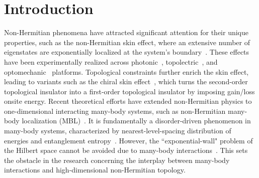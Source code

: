 \documentclass[longbibliography, aps, prx, amsmath, amssymb, amsfonts, twocolumn,superscriptaddress, footinbib]{revtex4-1}
\begin{document}
	\section{Introduction}
	Non-Hermitian phenomena have attracted significant attention for their unique properties, such as the non-Hermitian skin effect, where an extensive number of eigenstates are exponentially localized at the system's boundary~\cite{RN1166,RN1168,gong2018topological,kawabata2019symmetry,RN1212,RN1214,RN1217,RN1160}. 
	These effects have been experimentally realized across photonic~\cite{RN1165,RN1167,RN1227,nie2023non}, topolectric~\cite{zou2021observation,RN2,RN1225}, and optomechanic~\cite{RN632,RN1226} platforms. Topological constraints further enrich the skin effect, leading to variants such as the chiral skin effect~\cite{nakamura2023universal,ma2024non,schindler2023hermitian,lee2019hybrid,RN1221}, which turns the second-order topological insulator into a first-order topological insulator by imposing gain/loss onsite energy. 
	Recent theoretical efforts have extended non-Hermitian physics to one-dimensional interacting many-body systems, such as non-Hermitian many-body localization (MBL)~\cite{mak2024statics,hamazaki2019non}. 
	{
		It is fundamentally a disorder-driven phenomenon in many-body systems, characterized by nearest-level-spacing distribution of energies and entanglement entropy~\cite{abanin2019colloquium,alet2018many,mak2024statics,hamazaki2019non}.
	}
	However, the ``exponential-wall" problem of the Hilbert space cannot be avoided due to many-body interactions~\cite{Kohn1999}. This sets the obstacle in the research concerning the interplay between many-body interactions and high-dimensional non-Hermitian topology.
    
\end{document}
